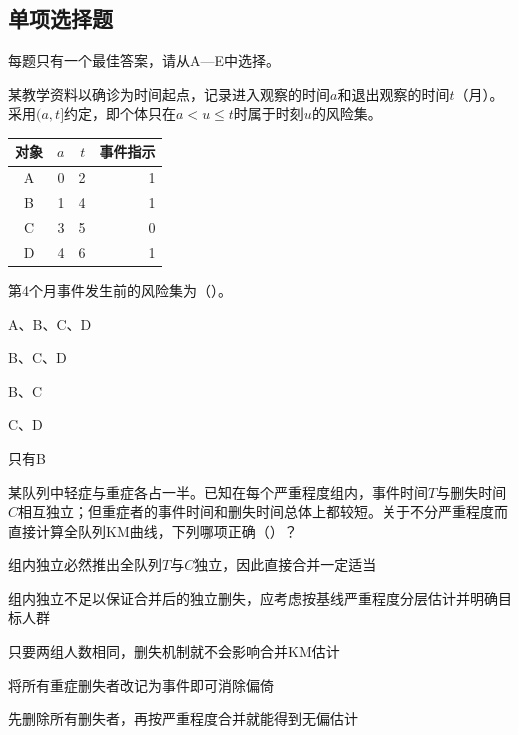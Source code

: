 \subsection{单项选择题}
每题只有一个最佳答案，请从A—E中选择。

\par\noindent\begin{minipage}{\linewidth}
某教学资料以确诊为时间起点，记录进入观察的时间$a$和退出观察的时间$t$（月）。采用$(a,t]$约定，即个体只在$a<u\le t$时属于时刻$u$的风险集。
\begin{center}\begin{tabular}{crrr}\toprule
对象 & $a$ & $t$ & 事件指示\\\midrule
A & 0 & 2 & 1\\
B & 1 & 4 & 1\\
C & 3 & 5 & 0\\
D & 4 & 6 & 1\\\bottomrule
\end{tabular}\end{center}
第4个月事件发生前的风险集为（\quad）。
\begin{choices}
\item A、B、C、D
\item B、C、D
\item B、C
\item C、D
\item 只有B
\end{choices}
\end{minipage}\par\medskip

\par\noindent\begin{minipage}{\linewidth}
某队列中轻症与重症各占一半。已知在每个严重程度组内，事件时间$T$与删失时间$C$相互独立；但重症者的事件时间和删失时间总体上都较短。关于不分严重程度而直接计算全队列KM曲线，下列哪项正确（\quad）？
\begin{choices}
\item 组内独立必然推出全队列$T$与$C$独立，因此直接合并一定适当
\item 组内独立不足以保证合并后的独立删失，应考虑按基线严重程度分层估计并明确目标人群
\item 只要两组人数相同，删失机制就不会影响合并KM估计
\item 将所有重症删失者改记为事件即可消除偏倚
\item 先删除所有删失者，再按严重程度合并就能得到无偏估计
\end{choices}
\end{minipage}\par\medskip


